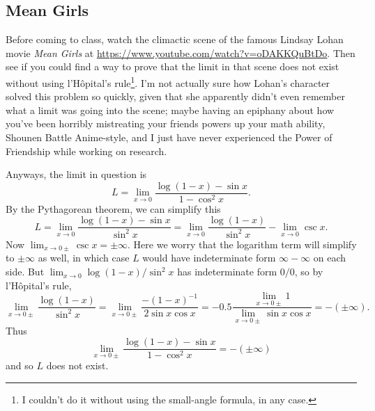 \documentclass[reqno,12pt,letterpaper]{amsart}
\theoremstyle{definition}
\numberwithin{equation}{section}
\begin{document}
\subsection{Mean Girls}
Before coming to class, watch the climactic scene of the famous Lindsay Lohan movie \emph{Mean Girls} at \url{https://www.youtube.com/watch?v=oDAKKQuBtDo}.
Then see if you could find a way to prove that the limit in that scene does not exist without using l'H\^opital's rule\footnote{I couldn't do it without using the small-angle formula, in any case.}.
I'm not actually sure how Lohan's character solved this problem so quickly, given that she apparently didn't even remember what a limit was going into the scene; maybe having an epiphany about how you've been horribly mistreating your friends powers up your math ability, Shounen Battle Anime-style, and I just have never experienced the Power of Friendship while working on research.

Anyways, the limit in question is
$$L = \lim_{x \to 0} \frac{\log(1 - x) - \sin x}{1 - \cos^2 x}.$$
By the Pythagorean theorem, we can simplify this
$$L = \lim_{x \to 0} \frac{\log(1 - x) - \sin x}{\sin^2 x} = \lim_{x \to 0} \frac{\log(1 - x)}{\sin^2 x} - \lim_{x \to 0} \csc x.$$
Now $\lim_{x \to 0\pm} \csc x = \pm\infty$.
Here we worry that the logarithm term will simplify to $\pm \infty$ as well, in which case $L$ would have indeterminate form $\infty - \infty$ on each side.
But $\lim_{x \to 0} \log(1-x)/\sin^2 x$ has indeterminate form $0/0$, so by l'H\^opital's rule,
$$\lim_{x \to 0\pm} \frac{\log(1 - x)}{\sin^2 x} = \lim_{x \to 0\pm} \frac{-(1 - x)^{-1}}{2 \sin x \cos x} = -0.5 \frac{\lim_{x \to 0\pm} 1}{\lim_{x \to 0\pm} \sin x \cos x} = -(\pm \infty).$$
Thus
$$\lim_{x \to 0\pm} \frac{\log(1 - x) - \sin x}{1 - \cos^2 x} = - (\pm \infty)$$
and so $L$ does not exist.


\printbibliography
\end{document}
